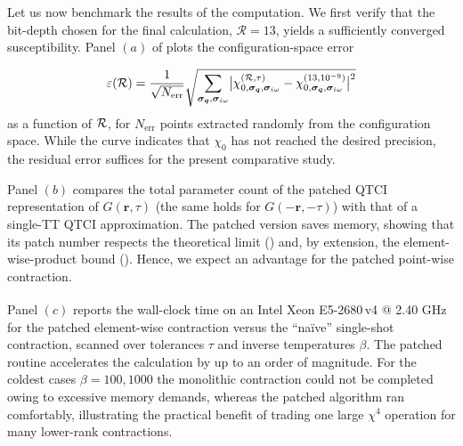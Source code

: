 Let us now benchmark the results of the computation. We first verify that the bit-depth chosen for the final calculation, \(\mathcal R=13\), yields a sufficiently converged susceptibility.
Panel $(a)$ of  plots the configuration-space error

\begin{equation}
    \varepsilon(\mathcal R)
  = \frac{1}{\sqrt{N_{\text{err}}}} \sqrt{\sum_{\boldsymbol{\sigma}_{\boldsymbol{q}},\boldsymbol{\sigma}_{i\omega}} \bigl|
      \chi_{0, \boldsymbol{\sigma}_{\boldsymbol{q}},\boldsymbol{\sigma}_{i\omega}}^{(\mathcal R,\tau)}
      -\chi_{0, \boldsymbol{\sigma}_{\boldsymbol{q}},\boldsymbol{\sigma}_{i\omega}}^{(13, 10^{-9})}
    \bigr|^2}
\end{equation}
as a function of $\mathcal{R}$, for $N_{\text{err}}$ points extracted randomly from the configuration space.  While the curve indicates that \(\chi_{0}\) has not reached the desired precision, the residual error suffices for the present comparative study.

Panel $(b)$ compares the total parameter count of the patched QTCI representation of \(G(\mathbf r,\tau)\) (the same holds for
\(G(-\mathbf r,-\tau)\)) with that of a single-TT QTCI approximation. The patched version saves memory, showing that its patch number respects the theoretical limit
() and, by extension, the element-wise-product bound (). Hence, we expect an advantage for the patched point-wise contraction. 

Panel $(c)$ reports the wall-clock time on an
Intel\textsuperscript{\textregistered} Xeon\textsuperscript{\textregistered}
E5-2680\,v4 @ 2.40 GHz for the patched element-wise contraction versus the
``naïve'' single-shot contraction, scanned over tolerances \(\tau\) and inverse temperatures \(\beta\). The patched routine accelerates the
calculation by up to an order of magnitude.  For the coldest cases $\beta=100,1000$ the monolithic contraction could not be completed owing to excessive memory demands, whereas the patched algorithm ran comfortably, illustrating the practical benefit of trading one large \(\chi^{4}\) operation for many lower-rank contractions.

